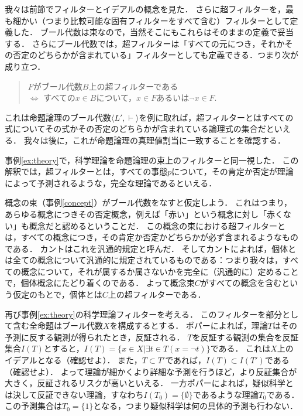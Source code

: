 \documentclass[11pt,a4paper]{jsarticle}
\begin{document}
我々は前節でフィルターとイデアルの概念を見た．
さらに超フィルターを，最も細かい（つまり比較可能な固有フィルターをすべて含む）フィルターとして定義した．
ブール代数は束なので，当然そこにもこれらはそのままの定義で妥当する．
さらにブール代数では，超フィルターは「すべての元につき，それかその否定のどちらかが含まれている」フィルターとしても定義できる．つまり次が成り立つ．
\begin{fact}
    \begin{quote}
        $F$がブール代数$B$上の超フィルターである 
        \\ $\iff$ すべての$x \in B$について，$x \in F$あるいは$\neg x \in F$.    
    \end{quote}
\end{fact}

これは命題論理のブール代数$\langle L', \vdash \rangle$を例に取れば，超フィルターとはすべての式についてその式かその否定のどちらかが含まれている論理式の集合だといえる．
我々は後に，これが命題論理の真理値割当に一致することを確認する．

\begin{example}[完全な理論]
事例\ref{ex:theory}で，科学理論を命題論理の束上のフィルターと同一視した．
この解釈では，超フィルターとは，すべての事態$p$について，その肯定か否定が理論によって予測されるような，完全な理論であるといえる．
\end{example}    

\begin{example}[汎通的規定]
概念の束（事例\ref{concept}）がブール代数をなすと仮定しよう．
これはつまり，あらゆる概念につきその否定概念，例えば「赤い」という概念に対し「赤くない」も概念だと認めるということだ．
この概念の束における超フィルターとは，すべての概念につき，その肯定か否定かどちらかが必ず含まれるようなものである．
カントはこれを汎通的規定と呼んだ．
そしてカントによれば，個体とは全ての概念について汎通的に規定されているものである：つまり我々は，すべての概念について，それが属するか属さないかを完全に（汎通的に）定めることで，個体概念にたどり着くのである．
よって概念束$C$がすべての概念を含むという仮定のもとで，個体とは$C$上の超フィルターである．
\end{example}

\begin{example}[反証可能性]
    再び事例\ref{ex:theory}の科学理論フィルターを考える．
    このフィルターを部分として含む全命題はブール代数$X$を構成するとする．
    ポパーによれば，理論$T$はその予測に反する観測が得られたとき，反証される．
    $T$を反証する観測の集合を反証集合$I(T)$とすると，$I(T)=\{ x \in X | \exists t \in T (x = \neg t) \}$である．
    これは$X$上のイデアルとなる（確認せよ）．
    また，$T \subset T'$であれば，$I(T) \subset I(T')$である（確認せよ）．
    よって理論が細かくより詳細な予測を行うほど，より反証集合が大きく，反証されるリスクが高いといえる．
    一方ポパーによれば，疑似科学とは決して反証できない理論，すなわち$I(T_0)= \{ \emptyset \}$であるような理論$T_0$である．
    この予測集合は$T_0 = \{1\}$となる，つまり疑似科学は何の具体的予測も行わない．
\end{example}
\end{document}
